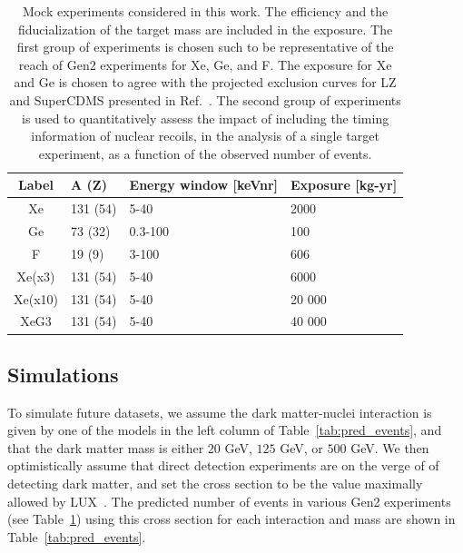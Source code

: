 \documentclass[11pt]{article}
\begin{document}
\begin{table}[tbp]
  \setlength{\extrarowheight}{3pt}
  \setlength{\tabcolsep}{10pt}
  \begin{center}
	\begin{tabular}{c|m{2.3cm}m{4.2cm}m{2.8cm}}  
	Label & A (Z) & Energy window [keVnr] & Exposure [kg-yr] \\
	\hline
	Xe & 131 (54) & 5-40 & 2000 \\
	Ge & 73 (32) & 0.3-100 & 100  \\
	F &  19 (9) & 3-100 & 606 \\

	\hline
	Xe(x3) & 131 (54) & 5-40 & 6000 \\
	Xe(x10) & 131 (54) & 5-40 & 20 000 \\
	XeG3 & 131 (54) & 5-40 & 40 000 \\
	\end{tabular}
  \end{center}
\caption{Mock experiments considered in this work. The efficiency and the fiducialization of the target mass are included in the exposure. The first group of experiments is chosen such to be representative of the reach of Gen2 experiments for Xe, Ge, and F. The exposure for Xe and Ge is chosen to agree with the projected exclusion curves for LZ and SuperCDMS presented in Ref.~\cite{Cushman:2013zza}. The second group of experiments is used to quantitatively assess the impact of including the timing information of nuclear recoils, in the analysis of a single target experiment, as a function of the observed number of events. }
\label{tab:experiments}
\end{table}

\subsection{Simulations \label{sec:sims}}

To simulate future datasets, we assume the dark matter-nuclei interaction is given by one of the models in the left column of Table~\ref{tab:pred_events}, and that the dark matter mass is either $20$ GeV, $125$ GeV, or $500$ GeV. We then optimistically assume that direct detection experiments are on the verge of of detecting dark matter, and set the cross section to be the value maximally allowed by LUX~\cite{Akerib:2016vxi}. The predicted number of events in various Gen2 experiments (see Table~\ref{tab:experiments}) using this cross section for each interaction and mass are shown in Table~\ref{tab:pred_events}. 
\end{document}
